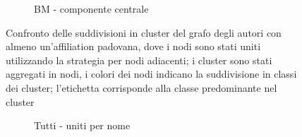 \documentclass[12pt,a4paper,twoside]{report}
\begin{document}
\begin{figure}[ht]
\begin{subfigure}[b]{0.5\textwidth}
                \caption{BM - componente centrale}
        \end{subfigure}%
    \caption{Confronto delle suddivisioni in cluster del grafo degli autori con almeno un'affiliation
    padovana, dove i nodi sono stati uniti utilizzando la strategia per nodi adiacenti; i cluster sono
    stati aggregati in nodi, i colori dei nodi indicano la suddivisione in classi dei cluster;
    l'etichetta corrisponde alla classe predominante nel cluster}
    \label{fig:grafipadovaniedgeaggregati}
\end{figure}

\clearpage
\begin{figure}[ht]
    \centering
        \begin{subfigure}[b]{0.5\textwidth}
                \centering
                \setlength{\fboxrule}{0pt} %
                \caption{Tutti - uniti per nome}
            \end{subfigure}%
            ~
            \begin{subfigure}[b]{0.5\textwidth}
                \centering
                \setlength{\fboxrule}{0pt} %

\end{subfigure}
\end{figure}
\end{document}
